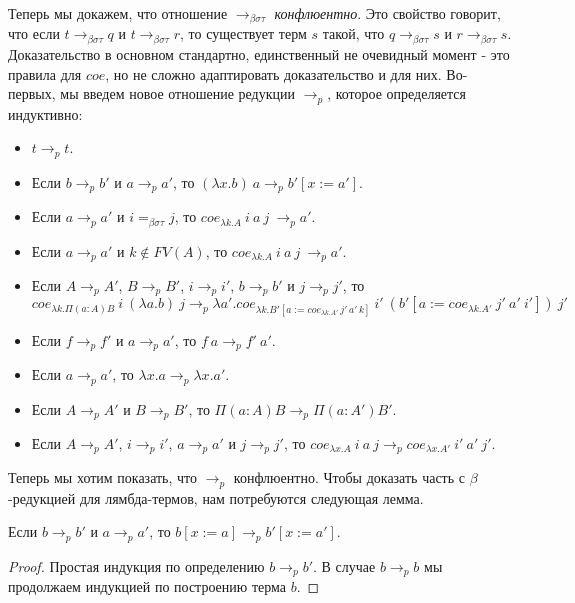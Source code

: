\documentclass{amsart}
\theoremstyle{definition}
\theoremstyle{remark}
\newcommand{\bs}{\beta\sigma}
\newcommand{\bst}{\bs\tau}
\newcommand{\ebst}{=_{\bst}}
\newcommand{\rbst}{\to_{\bst}}
\numberwithin{figure}{section}
\begin{document}
Теперь мы докажем, что отношение $\rbst$ \emph{конфлюентно}.
Это свойство говорит, что если $t \rbst q$ и $t \rbst r$, то существует терм $s$ такой, что $q \rbst s$ и $r \rbst s$.
Доказательство в основном стандартно, единственный не очевидный момент - это правила для $coe$, но не сложно адаптировать доказательство и для них.
Во-первых, мы введем новое отношение редукции $\to_p$, которое определяется индуктивно:
\begin{itemize}
\item $t \to_p t$.
\item Если $b \to_p b'$ и $a \to_p a'$, то $(\lambda x. b)\ a \to_p b'[x := a']$.
\item Если $a \to_p a'$ и $i \ebst j$, то $coe_{\lambda k. A}\ i\ a\ j\ \to_p a'$.
\item Если $a \to_p a'$ и $k \notin FV(A)$, то $coe_{\lambda k. A}\ i\ a\ j\ \to_p a'$.
\item Если $A \to_p A'$, $B \to_p B'$, $i \to_p i'$, $b \to_p b'$ и $j \to_p j'$, то
    \[ coe_{\lambda k. \Pi (a : A) B}\ i\ (\lambda a. b)\ j \to_p \lambda a'. coe_{\lambda k. B'[a := coe_{\lambda k. A'}\,j'\,a'\,k]}\ i'\ (b'[a := coe_{\lambda k. A'}\ j'\ a'\ i'])\ j' \]
\item Если $f \to_p f'$ и $a \to_p a'$, то $f\ a \to_p f'\ a'$.
\item Если $a \to_p a'$, то $\lambda x. a \to_p \lambda x. a'$.
\item Если $A \to_p A'$ и $B \to_p B'$, то $\Pi (a : A) B \to_p \Pi (a : A') B'$.
\item Если $A \to_p A'$, $i \to_p i'$, $a \to_p a'$ и $j \to_p j'$, то $coe_{\lambda x. A}\ i\ a\ j \to_p coe_{\lambda x. A'}\ i'\ a'\ j'$.
\end{itemize}

Теперь мы хотим показать, что $\to_p$ конфлюентно.
Чтобы доказать часть с $\beta$-редукцией для лямбда-термов, нам потребуются следующая лемма.

\begin{lem}
Если $b \to_p b'$ и $a \to_p a'$, то $b[x := a] \to_p b'[x := a']$.
\end{lem}
\begin{proof}
Простая индукция по определению $b \to_p b'$.
В случае $b \to_p b$ мы продолжаем индукцией по построению терма $b$.
\end{proof}
\end{document}

